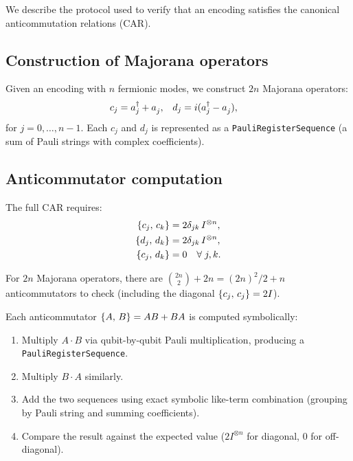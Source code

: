 
We describe the protocol used to verify that an encoding satisfies
the canonical anticommutation relations (CAR).

\subsection*{Construction of Majorana operators}

Given an encoding with $n$ fermionic modes, we construct $2n$
Majorana operators:
\begin{align}
  c_j &= \ad{j} + \an{j}, &
  d_j &= i(\ad{j} - \an{j}),
  \label{eq:majorana-construction}
\end{align}
for $j = 0, \ldots, n-1$.  Each $c_j$ and $d_j$ is represented as a
\texttt{PauliRegisterSequence} (a sum of Pauli strings with complex
coefficients).

\subsection*{Anticommutator computation}

The full CAR requires:
\begin{align}
  \{c_j,\,c_k\} &= 2\delta_{jk}\, I^{\otimes n}, \\
  \{d_j,\,d_k\} &= 2\delta_{jk}\, I^{\otimes n}, \\
  \{c_j,\,d_k\} &= 0 \quad \forall\; j, k.
\end{align}

For $2n$ Majorana operators, there are $\binom{2n}{2} + 2n =
(2n)^2/2 + n$ anticommutators to check (including the diagonal
$\{c_j,\,c_j\} = 2I$).

Each anticommutator $\{A,\,B\} = AB + BA$ is computed symbolically:
\begin{enumerate}
  \item Multiply $A \cdot B$ via qubit-by-qubit Pauli multiplication,
    producing a \texttt{PauliRegisterSequence}.
  \item Multiply $B \cdot A$ similarly.
  \item Add the two sequences using exact symbolic like-term
    combination (grouping by Pauli string and summing coefficients).
  \item Compare the result against the expected value ($2I^{\otimes n}$
    for diagonal, $0$ for off-diagonal).
\end{enumerate}

